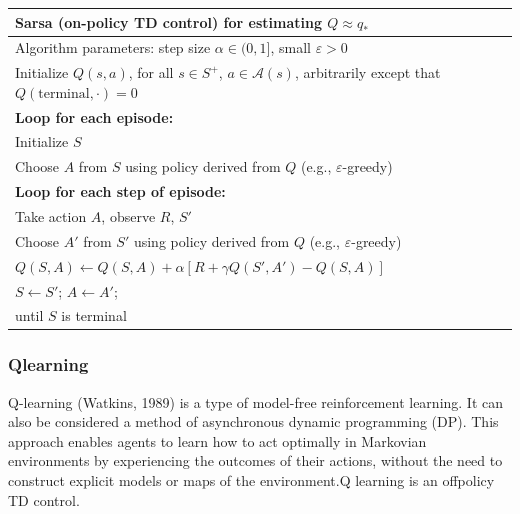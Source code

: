 \documentclass[a4paper,12pt]{Classes/RoboticsLaTeX}
\begin{document}
    \begin{center}
    \begin{tabular}{|l|}
    \hline
    \textbf{Sarsa (on-policy TD control) for estimating $Q \approx q_*$} \\
    \hline
    Algorithm parameters: step size $\alpha \in (0, 1]$, small $\varepsilon > 0$ \\
    Initialize $Q(s, a)$, for all $s \in S^+$, $a \in \mathcal{A}(s)$, arbitrarily except that $Q(\text{terminal}, \cdot) = 0$ \\
    \textbf{Loop for each episode:} \\
    \hspace{1em} Initialize $S$ \\
    \hspace{1em} Choose $A$ from $S$ using policy derived from $Q$ (e.g., $\varepsilon$-greedy) \\
    \hspace{1em} \textbf{Loop for each step of episode:} \\
    \hspace{2em} Take action $A$, observe $R$, $S'$ \\
    \hspace{2em} Choose $A'$ from $S'$ using policy derived from $Q$ (e.g., $\varepsilon$-greedy) \\
    \hspace{2em} $Q(S, A) \leftarrow Q(S, A) + \alpha \left[ R + \gamma Q(S', A') - Q(S, A) \right]$ \\
    \hspace{2em} $S \leftarrow S'$; $A \leftarrow A'$; \\
    \hspace{1em} until $S$ is terminal \\
    \hline
    \end{tabular}
    \end{center}

    \subsubsection{Qlearning}
    Q-learning (Watkins, 1989) is a type of model-free reinforcement learning. It can also be considered a method of asynchronous dynamic programming (DP). This approach enables agents to learn how to act optimally in Markovian environments by experiencing the outcomes of their actions, without the need to construct explicit models or maps of the environment.Q learning is an offpolicy TD control.\cite{watkins1992q}
    
\end{document}
